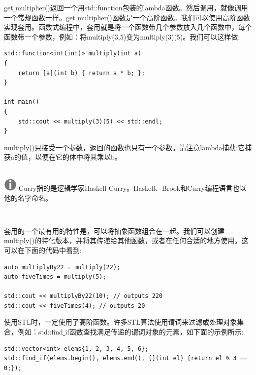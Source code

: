 get\underline{ }multiplier()返回一个用std::function包装的lambda函数。然后调用，就像调用一个常规函数一样。get\underline{ }multiplier()函数是一个高阶函数。我们可以使用高阶函数实现套用。函数式编程中，套用就是将一个函数带几个参数放入几个函数中，每个函数带一个参数，例如：将multiply(3,5)变为multiply(3)(5)。我们可以这样做: \par

\begin{lstlisting}[caption={}]
std::function<int(int)> multiply(int a)
{
	return [a](int b) { return a * b; };
}

int main()
{
	std::cout << multiply(3)(5) << std::endl;
}
\end{lstlisting}

multiply()只接受一个参数，返回的函数也只有一个参数。请注意lambda捕获:它捕获a的值，以便在它的体中将其乘以b。 \par

\hspace*{\fill} \\ %
\includegraphics[width=0.05\textwidth]{images/warn}
Curry指的是逻辑学家Haskell Curry。Haskell、Brook和Curry编程语言也以他的名字命名。 \par
\noindent\textbf{}\ \par

套用的一个最有用的特性是，可以将抽象函数组合在一起。我们可以创建multiply()的特化版本，并将其传递给其他函数，或者在任何合适的地方使用。这可以在下面的代码中看到: \par

\begin{lstlisting}[caption={}]
auto multiplyBy22 = multiply(22);
auto fiveTimes = multiply(5);

std::cout << multiplyBy22(10); // outputs 220
std::cout << fiveTimes(4); // outputs 20
\end{lstlisting}

使用STL时，一定使用了高阶函数。许多STL算法使用谓词来过滤或处理对象集合，例如：std::find\underline{ }if函数查找满足传递的谓词对象的元素，如下面的示例所示: \par

\begin{lstlisting}[caption={}]
std::vector<int> elems{1, 2, 3, 4, 5, 6};
std::find_if(elems.begin(), elems.end(), [](int el) {return el % 3 == 0;});
\end{lstlisting}

